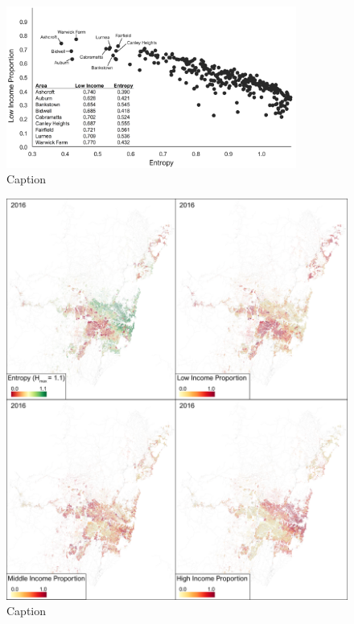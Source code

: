 \begin{figure}[H]
    \centering
    \includegraphics[width=0.85\textwidth]{body/figures/low-inc_ent.png}
    \caption{Caption}
    \label{fig:low_inc_ent}
\end{figure}

\begin{figure}[p]
    \centering
    \includegraphics[width=1\textwidth]{body/figures/Income_Proportion_16.png}
    \caption{Caption}
    \label{fig:entropy_income}
\end{figure}

